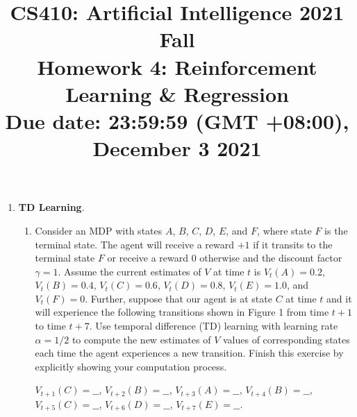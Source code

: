 \documentclass{article}
\title{\normalsize
CS410: Artificial Intelligence 2021 Fall\\
Homework 4: Reinforcement
Learning \& Regression \\
Due date: 23:59:59 (GMT +08:00), December 3 2021}
\author{}
\date{}
\begin{document}
 
\maketitle

\begin{enumerate}
    \item \textbf{TD Learning}.
    \begin{enumerate}
        \item     	Consider an MDP with states $A$, $B$, $C$, $D$, $E$, and $F$, where state $F$ is the terminal state. The agent will receive a reward $+1$ if it transits to the terminal state $F$ or receive a reward $0$ otherwise and the discount factor $\gamma=1$. Assume the current estimates of $V$ at time $t$ is $V_t (A)=0.2$,  $V_t (B)=0.4$,  $V_t (C)=0.6$,  $V_t (D)=0.8$,  $V_t (E)=1.0$, and $V_t (F)=0$. Further, suppose that our agent is at state $C$ at time $t$ and it will experience the following transitions shown in Figure 1 from time $t+1$ to time $t+7$. Use temporal difference (TD) learning with learning rate $\alpha=1/2$ to compute the new estimates of $V$ values of corresponding states each time the agent experiences a new transition. Finish this exercise by explicitly showing your computation process.
    
    
    $V_{t+1}(C)=\_\_$,
    $V_{t+2}(B)=\_\_$,
    $V_{t+3}(A)=\_\_$,
    $V_{t+4}(B)=\_\_$,\\
    $V_{t+5}(C)=\_\_$,
    $V_{t+6}(D)=\_\_$,
    $V_{t+7}(E)=\_\_$.
    

\end{enumerate}
\end{enumerate}
\end{document}
